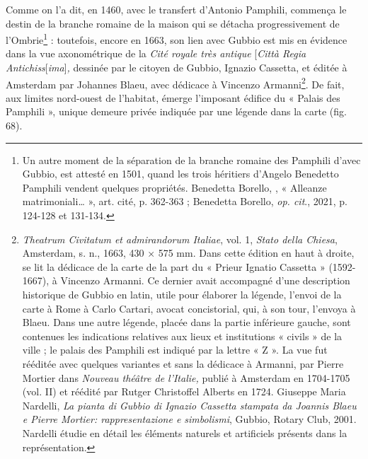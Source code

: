 \documentclass[12pt,twoside,openany]{book}
\begin{document}
Comme on l’a dit, en 1460, avec le transfert d’Antonio Pamphili, commença le destin de la branche romaine de la maison qui se détacha progressivement de l’Ombrie\footnote{Un autre moment de la séparation de la branche romaine des Pamphili d’avec Gubbio, est attesté en 1501, quand les trois héritiers d’Angelo Benedetto Pamphili vendent quelques propriétés. Benedetta Borello, , « Alleanze matrimoniali… », art. cité, p. 362-363 ; Benedetta Borello, \textit{op. cit}., 2021, p. 124-128 et 131-134.} : toutefois, encore en 1663, son lien avec Gubbio est mis en évidence dans la vue axonométrique de la \textit{Cité royale très antique }[\textit{Città Regia Antichiss}[\textit{ima}]\textit{,} dessinée par le citoyen de Gubbio, Ignazio Cassetta, et éditée à Amsterdam par Johannes Blaeu, avec dédicace à Vincenzo Armanni\footnote{\textit{Theatrum Civitatum et admirandorum Italiae}, vol. 1, \textit{Stato della Chiesa}, Amsterdam, s. n., 1663, 430 × 575 mm. Dans cette édition en haut à droite, se lit la dédicace de la carte de la part du « Prieur Ignatio Cassetta » (1592-1667), à Vincenzo Armanni. Ce dernier avait accompagné d’une description historique de Gubbio en latin, utile pour élaborer la légende, l’envoi de la carte à Rome à Carlo Cartari, avocat concistorial, qui, à son tour, l’envoya à Blaeu. Dans une autre légende, placée dans la partie inférieure gauche, sont contenues les indications relatives aux lieux et institutions « civils » de la ville ; le palais des Pamphili est indiqué par la lettre « Z ». La vue fut rééditée avec quelques variantes et sans la dédicace à Armanni, par Pierre Mortier dans \textit{Nouveau théâtre de l’Italie,} publié à Amsterdam en 1704-1705 (vol. II) et réédité par Rutger Christoffel Alberts en 1724. Giuseppe Maria Nardelli, \textit{La pianta di Gubbio di Ignazio Cassetta stampata da Joannis Blaeu e Pierre Mortier: rappresentazione e simbolismi}, Gubbio, Rotary Club, 2001. Nardelli étudie en détail les éléments naturels et artificiels présents dans la représentation.}. De fait, aux limites nord-ouest de l’habitat, émerge l’imposant édifice du « Palais des Pamphili », unique demeure privée indiquée par une légende dans la carte (fig. 68).
\end{document}
